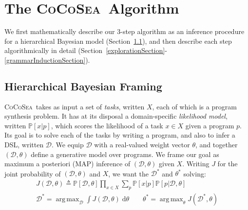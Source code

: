 \documentclass{article}
\newcommand{\system}{\textsc{CoCoSea}~}
\DeclareMathOperator*{\argmax}{arg\,max} %
\newcommand{\probability}{\mathds{P}} %
\begin{document}



 \section{The \system Algorithm}
 We first mathematically describe our 3-step algorithm as
 an inference procedure for a hierarchical Bayesian model (Section~\ref{mathematicalFraming}),
  and then describe each step algorithmically in detail (Section~\ref{explorationSection}-\ref{grammarInductionSection}).

 \subsection{Hierarchical Bayesian Framing}\label{mathematicalFraming}

\system takes as input a set of \emph{tasks}, written $X$, each of which is a program synthesis problem.
It has at its disposal a domain-specific \emph{likelihood model}, written $\probability[x|p]$, which scores the likelihood of a task $x\in X$ given a program $p$.%
Its goal is to solve each of the tasks by writing a program,
and also to infer a DSL, written $\mathcal{D}$.
We equip $\mathcal{D}$ with a real-valued weight vector $\theta$, and together
$(\mathcal{D},\theta)$ define a generative model over programs.
We frame our goal as maximum a posteriori (MAP) inference of $(\mathcal{D},\theta)$ given $X$.
Writing $J$ for the joint probability of $(\mathcal{D},\theta)$ and $X$, we want the $\mathcal{D}^*$ and $\theta^*$ solving:
\begin{align}\label{intractableObjectives}
\nonumber  J(\mathcal{D},\theta)\triangleq \probability[\mathcal{D},\theta]\prod_{x\in X} \sum_p \probability[x|p]\probability[p|\mathcal{D},\theta]\\
  \mathcal{D}^* = \argmax_{\mathcal{D}}\int J(\mathcal{D},\theta)\;\mathrm{d}\theta \qquad
  \theta^* =\argmax_\theta J(\mathcal{D}^*,\theta)
\end{align}
\end{document}
